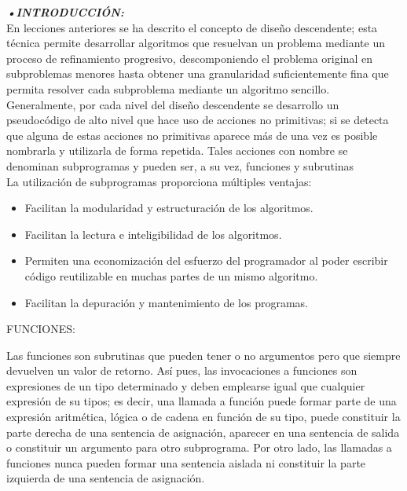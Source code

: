 
 

\pagestyle{empty} %

\titleGP %
\newpage

\textbf{\textit{•INTRODUCCI\'ON:}}\\
En lecciones anteriores se ha descrito el concepto de diseño descendente; esta t\'ecnica permite desarrollar
algoritmos que resuelvan un problema mediante un proceso de refinamiento progresivo, descomponiendo el problema
original en subproblemas menores hasta obtener una granularidad suficientemente fina que permita resolver cada
subproblema mediante un algoritmo sencillo.
Generalmente, por cada nivel del diseño descendente se desarrollo un pseudoc\'odigo de alto nivel que hace
uso de acciones no primitivas; si se detecta que alguna de estas acciones no primitivas aparece m\'as de una vez es
posible nombrarla y utilizarla de forma repetida. Tales acciones con nombre se denominan subprogramas y pueden ser,
a su vez, funciones y subrutinas \\
La utilización de subprogramas proporciona múltiples ventajas:

\begin{itemize}
\item Facilitan la modularidad y estructuración de los algoritmos.
\item Facilitan la lectura e inteligibilidad de los algoritmos.
\item Permiten una economización del esfuerzo del programador al poder escribir código reutilizable en muchas
partes de un mismo algoritmo.
\item Facilitan la depuración y mantenimiento de los programas.
\end{itemize}

FUNCIONES:

Las funciones son subrutinas que pueden tener o no argumentos pero que siempre devuelven un valor de
retorno. Así pues, las invocaciones a funciones son expresiones de un tipo determinado y deben emplearse igual que
cualquier expresión de su tipos; es decir, una llamada a función puede formar parte de una expresión aritmética, lógica o
de cadena en función de su tipo, puede constituir la parte derecha de una sentencia de asignación, aparecer en una
sentencia de salida o constituir un argumento para otro subprograma. Por otro lado, las llamadas a funciones nunca
pueden formar una sentencia aislada ni constituir la parte izquierda de una sentencia de asignación.

